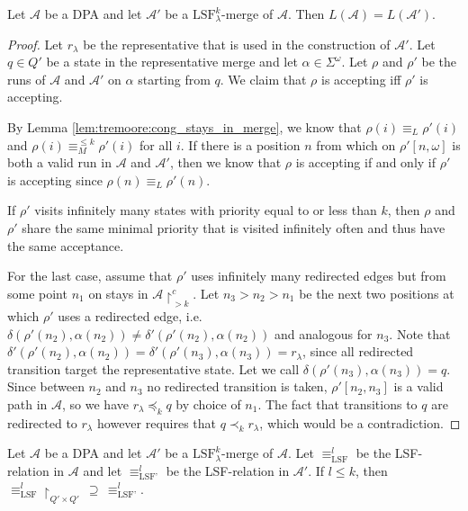 \begin{theorem}
	Let $\mathcal{A}$ be a DPA and let $\mathcal{A}'$ be a $\text{LSF}_\lambda^k$-merge of $\mathcal{A}$. Then $L(\mathcal{A}) = L(\mathcal{A}')$.
	\label{thm:lsf:correctness}
\end{theorem}

\begin{proof}
	Let $r_\lambda$ be the representative that is used in the construction of $\mathcal{A}'$. Let $q \in Q'$ be a state in the representative merge and let $\alpha \in \Sigma^\omega$. Let $\rho$ and $\rho'$ be the runs of $\mathcal{A}$ and $\mathcal{A}'$ on $\alpha$ starting from $q$. We claim that $\rho$ is accepting iff $\rho'$ is accepting.
	
	By Lemma \ref{lem:tremoore:cong_stays_in_merge}, we know that $\rho(i) \equiv_L \rho'(i)$ and $\rho(i) \equiv_M^{\leq k} \rho'(i)$ for all $i$. If there is a position $n$ from which on $\rho'[n,\omega]$ is both a valid run in $\mathcal{A}$ and $\mathcal{A}'$, then we know that $\rho$ is accepting if and only if $\rho'$ is accepting since $\rho(n) \equiv_L \rho'(n)$.
	
	If $\rho'$ visits infinitely many states with priority equal to or less than $k$, then $\rho$ and $\rho'$ share the same minimal priority that is visited infinitely often and thus have the same acceptance.
	
	For the last case, assume that $\rho'$ uses infinitely many redirected edges but from some point $n_1$ on stays in $\mathcal{A}\upharpoonright^c_{>k}$. Let $n_3 > n_2 > n_1$ be the next two positions at which $\rho'$ uses a redirected edge, i.e. $\delta(\rho'(n_2), \alpha(n_2)) \neq \delta'(\rho'(n_2), \alpha(n_2))$ and analogous for $n_3$. Note that $\delta'(\rho'(n_2), \alpha(n_2)) = \delta'(\rho'(n_3), \alpha(n_3)) = r_\lambda$, since all redirected transition target the representative state. Let we call $\delta(\rho'(n_3), \alpha(n_3)) = q$. Since between $n_2$ and $n_3$ no redirected transition is taken, $\rho'[n_2, n_3]$ is a valid path in $\mathcal{A}$, so we have $r_\lambda \preceq_k q$ by choice of $n_1$. The fact that transitions to $q$ are redirected to $r_\lambda$ however requires that $q \prec_k r_\lambda$, which would be a contradiction.
\end{proof}


\begin{lem}
	Let $\mathcal{A}$ be a DPA and let $\mathcal{A}'$ be a $\text{LSF}_\lambda^k$-merge of $\mathcal{A}$. Let $\equiv_\text{LSF}^l$ be the LSF-relation in $\mathcal{A}$ and let $\equiv_\text{LSF'}^l$ be the LSF-relation in $\mathcal{A}'$. If $l \leq k$, then $\equiv_\text{LSF}^l \upharpoonright_{Q' \times Q'} \,\supseteq\, \equiv_\text{LSF'}^l$.
	\label{lem:lsf:constr_does_not_change_lower_k}
\end{lem}

